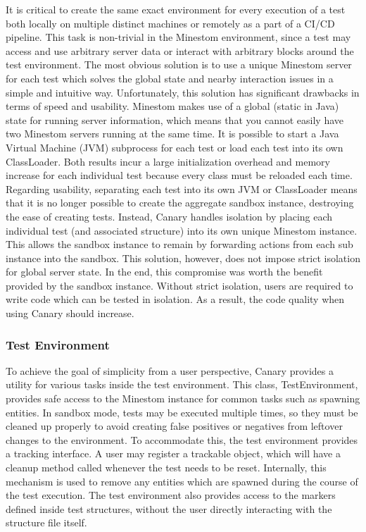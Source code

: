 \documentclass[12pt]{article}
\begin{document}
\begin{onehalfspacing}
It is critical to create the same exact environment for every execution
of a test both locally on multiple distinct machines or remotely as a
part of a CI/CD pipeline. This task is non-trivial in the Minestom
environment, since a test may access and use arbitrary server data or
interact with arbitrary blocks around the test environment. The most
obvious solution is to use a unique Minestom server for each test which
solves the global state and nearby interaction issues in a simple and
intuitive way. Unfortunately, this solution has significant drawbacks in
terms of speed and usability. Minestom makes use of a global (static in
Java) state for running server information, which means that you cannot
easily have two Minestom servers running at the same time. It is
possible to start a Java Virtual Machine (JVM) subprocess for each test
or load each test into its own ClassLoader. Both results incur a large
initialization overhead and memory increase for each individual test
because every class must be reloaded each time. Regarding usability,
separating each test into its own JVM or ClassLoader means that it is no
longer possible to create the aggregate sandbox instance, destroying the
ease of creating tests. Instead, Canary handles isolation by placing
each individual test (and associated structure) into its own unique
Minestom instance. This allows the sandbox instance to remain by
forwarding actions from each sub instance into the sandbox. This
solution, however, does not impose strict isolation for global server
state. In the end, this compromise was worth the benefit provided by the
sandbox instance. Without strict isolation, users are required to write
code which can be tested in isolation. As a result, the code quality
when using Canary should increase.

\subsubsection{Test Environment}

To achieve the goal of simplicity from a user perspective, Canary
provides a utility for various tasks inside the test environment. This
class, TestEnvironment, provides safe access to the Minestom instance
for common tasks such as spawning entities. In sandbox mode, tests may
be executed multiple times, so they must be cleaned up properly to avoid
creating false positives or negatives from leftover changes to the
environment. To accommodate this, the test environment provides a
tracking interface. A user may register a trackable object, which will
have a cleanup method called whenever the test needs to be reset.
Internally, this mechanism is used to remove any entities which are
spawned during the course of the test execution. The test environment
also provides access to the markers defined inside test structures,
without the user directly interacting with the structure file itself.


\end{onehalfspacing}
\end{document}
